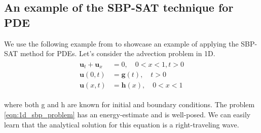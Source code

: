 \subsection{An example of the SBP-SAT technique for PDE}
We use the following example from \cite{RUGGIU2018216} to showcase an example of applying the SBP-SAT method for PDEs. Let's consider the advection problem in 1D.
\begin{align}
    \begin{split}
    \boldsymbol{u}_t + \boldsymbol{u}_x &= 0, \quad 0 < x < 1,  t > 0 \\
    \boldsymbol{u}(0,t) &=  \boldsymbol{g}(t),  \quad  t > 0 \\
    \boldsymbol{u}(x,t) &= \boldsymbol{h}(x), \quad 0 < x < 1
    \end{split}
     \label{eqn:1d_sbp_problem}
\end{align}

where both g and h are known for initial and boundary conditions. The problem \autoref{eqn:1d_sbp_problem} has an energy-estimate and is well-posed. We can easily learn that the analytical solution for this equation is a right-traveling wave.

